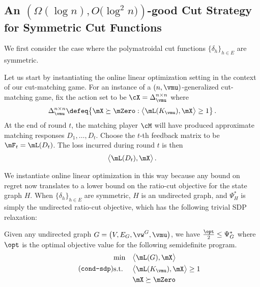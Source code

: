 \documentclass[letterpaper]{article}
\begin{document}
\subsection{An \texorpdfstring{$\left( \Omega (\log n), O \big( \log^2 n \big) \right)$}{(Omega(log n), O(log\^2 n))}-good Cut Strategy for Symmetric Cut Functions}

We first consider the case where the polymatroidal cut functions $\{ \delta_h \}_{h \in E}$ are symmetric.

Let us start by instantiating the online linear optimization setting in the context of our cut-matching game. For an instance of a $(n, \vmu)$-generalized cut-matching game, fix the action set to be $\cX = \Delta^{n \times n}_{\vmu}$ where
\begin{equation*}
\Delta^{n \times n}_{\vmu}
\defeq \big\{ \mX \succeq \mZero : \big\langle \mL(K_{\vmu}), \mX \big\rangle \geq 1 \big\} \, .
\end{equation*}
At the end of round $t$, the matching player $\cM$ will have produced approximate matching responses $D_1, \ldots, D_t$. Choose the $t$-th feedback matrix to be $\mF_t = \mL(D_t)$. The loss incurred during round $t$ is then
\begin{equation*}
\big\langle \mL(D_t), \mX \big\rangle \, .
\end{equation*}

We instantiate online linear optimization in this way because any bound on regret now translates to a lower bound on the ratio-cut objective for the state graph $H$. When $\{ \delta_h \}_{h \in E}$ are symmetric, $H$ is an undirected graph, and $\Psi_H^*$ is simply the undirected ratio-cut objective, which has the following trivial SDP relaxation:
\begin{lemma}
\label{lem.sym-cut-strat.relaxation}
Given any undirected graph $G = \big( V, E_G, \vw^G, \vmu \big)$, we have $\frac{\opt}{2} \leq \Psi_G^*$ where $\opt$ is the optimal objective value for the following semidefinite program.
\begin{equation*}
\stepcounter{equation}
\tag{\texttt{cond-sdp}}
\label{eq.cond-sdp}
\begin{aligned}
& {\min}
& & \big\langle \mL(G), \mX \big\rangle \\
& \textup{s.t.}
& & \big\langle \mL(K_{\vmu}), \mX \big\rangle \geq 1 \\
& & & \mX \succeq \mZero
\end{aligned}
\end{equation*}
\end{lemma}
\end{document}
